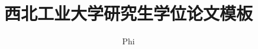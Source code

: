 \classno{***}
\secretlevel{}
\title[ Northwestern Polytechnical University graduate thesis template ]{	西北工业大学研究生学位论文模板}
\author[Phi]{Phi}
\SVBfalse%
{}

\makecover